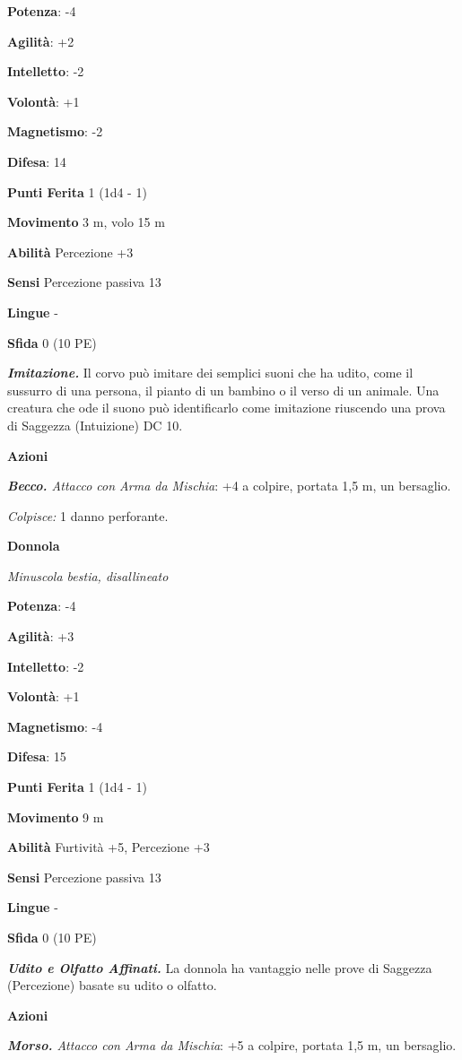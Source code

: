 \begin{multicols}{2}
\textbf{Potenza}: -4

\textbf{Agilità}: +2

\textbf{Intelletto}: -2

\textbf{Volontà}: +1

\textbf{Magnetismo}: -2

\textbf{Difesa}: 14

\textbf{Punti Ferita} 1 (1d4 - 1)

\textbf{Movimento} 3 m, volo 15 m

\textbf{Abilità} Percezione +3

\textbf{Sensi} Percezione passiva 13

\textbf{Lingue} -

\textbf{Sfida} 0 (10 PE)

\emph{\textbf{Imitazione.}} Il corvo può imitare dei semplici suoni che
ha udito, come il sussurro di una persona, il pianto di un bambino o il
verso di un animale. Una creatura che ode il suono può identificarlo
come imitazione riuscendo una prova di Saggezza (Intuizione) DC 10.

\textbf{Azioni}

\emph{\textbf{Becco.} Attacco con Arma da Mischia}: +4 a colpire,
portata 1,5 m, un bersaglio.

\emph{Colpisce:} 1 danno perforante.

\textbf{Donnola}

\emph{Minuscola bestia, disallineato}

\textbf{Potenza}: -4

\textbf{Agilità}: +3

\textbf{Intelletto}: -2

\textbf{Volontà}: +1

\textbf{Magnetismo}: -4

\textbf{Difesa}: 15

\textbf{Punti Ferita} 1 (1d4 - 1)

\textbf{Movimento} 9 m

\textbf{Abilità} Furtività +5, Percezione +3

\textbf{Sensi} Percezione passiva 13

\textbf{Lingue} -

\textbf{Sfida} 0 (10 PE)

\emph{\textbf{Udito e Olfatto Affinati.}} La donnola ha vantaggio nelle
prove di Saggezza (Percezione) basate su udito o olfatto.

\textbf{Azioni}

\emph{\textbf{Morso.} Attacco con Arma da Mischia}: +5 a colpire,
portata 1,5 m, un bersaglio.


\end{multicols}
